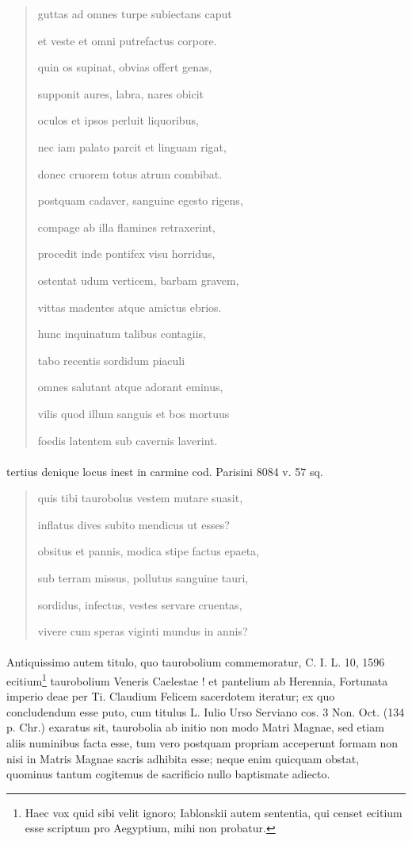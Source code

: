 \documentclass[a4paper, 11pt, oneside, polutonikogreek, german, twocolumn]{article}
\begin{document}
\begin{quotation}
guttas ad omnes turpe subiectans caput

et veste et omni putrefactus corpore.

\bigskip

quin os supinat, obvias offert genas,

supponit aures, labra, nares obicit

oculos et ipsos perluit liquoribus,

nec iam palato parcit et linguam rigat,

donec cruorem totus atrum combibat.

\bigskip

postquam cadaver, sanguine egesto rigens,

compage ab illa flamines retraxerint,

procedit inde pontifex visu horridus,

ostentat udum verticem, barbam gravem,

vittas madentes atque amictus ebrios.

\bigskip

hunc inquinatum talibus contagiis,

tabo recentis sordidum piaculi

omnes salutant atque adorant eminus,

vilis quod illum sanguis et bos mortuus

foedis latentem sub cavernis laverint.
\end{quotation}
\paragraph{}
tertius denique locus inest in carmine cod. Parisini 8084 v. 57 sq.
\begin{quotation}
quis tibi taurobolus vestem mutare suasit,

inflatus dives subito mendicus ut esses?

obsitus et pannis, modica stipe factus epaeta,

sub terram missus, pollutus sanguine tauri,

sordidus, infectus, vestes servare cruentas,

vivere cum speras viginti mundus in annis?
\end{quotation}
\paragraph{}
Antiquissimo autem titulo, quo taurobolium commemoratur, C. I. L. 10, 1596 ecitium\footnote{Haec vox quid sibi velit ignoro; Iablonskii autem sententia, qui censet ecitium esse scriptum pro Aegyptium, mihi non probatur.} taurobolium Veneris Caelestae ! et pantelium ab Herennia, Fortunata imperio deae per Ti. Claudium Felicem sacerdotem iteratur; ex quo concludendum esse puto, cum titulus L. Iulio Urso Serviano cos. 3 Non. Oct. (134 p. Chr.) exaratus sit, taurobolia ab initio non modo Matri Magnae, sed etiam aliis numinibus facta esse, tum vero postquam propriam acceperunt formam non nisi in Matris Magnae sacris adhibita esse; neque enim quicquam obstat, quominus tantum cogitemus de sacrificio nullo baptismate adiecto.
\end{document}

